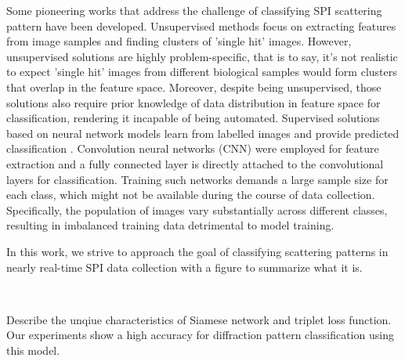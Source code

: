 Some pioneering works that address the challenge of classifying SPI scattering
pattern have been developed.  Unsupervised methods
\cite{yoonUnsupervisedClassificationSingleparticle2011,
giannakisSymmetriesImageFormation2012,schwanderSymmetriesImageFormation2012,
yoonNovelAlgorithmsCoherent2012,
andreassonAutomatedIdentificationClassification2014,
bobkovSortingAlgorithmsSingleparticle2015a} focus on extracting features from
image samples and finding clusters of 'single hit' images.  However,
unsupervised solutions are highly problem-specific, that is to say, it's not
realistic to expect 'single hit' images from different biological samples would
form clusters that overlap in the feature space.  Moreover, despite being
unsupervised, those solutions also require prior knowledge of data distribution
in feature space for classification, rendering it incapable of being automated.
Supervised solutions based on neural network models learn from labelled images
and provide predicted classification
\cite{shiEvaluationPerformanceClassification2019,
ignatenkoClassificationDiffractionPatterns2021}.  Convolution neural networks
(CNN) were employed for feature extraction and a fully connected layer is
directly attached to the convolutional layers for classification.  Training such
networks demands a large sample size for each class, which might not be
available during the course of data collection.  Specifically, the population of
images vary substantially across different classes, resulting in imbalanced
training data detrimental to model training.  



In this work, we strive to approach the goal of classifying scattering patterns
in nearly real-time SPI data collection {\color{gray} with a figure to summarize
what it is}.  






\

Describe the unqiue characteristics of Siamese network and triplet loss
function.  Our experiments show a high accuracy for diffraction pattern
classification using this model.
